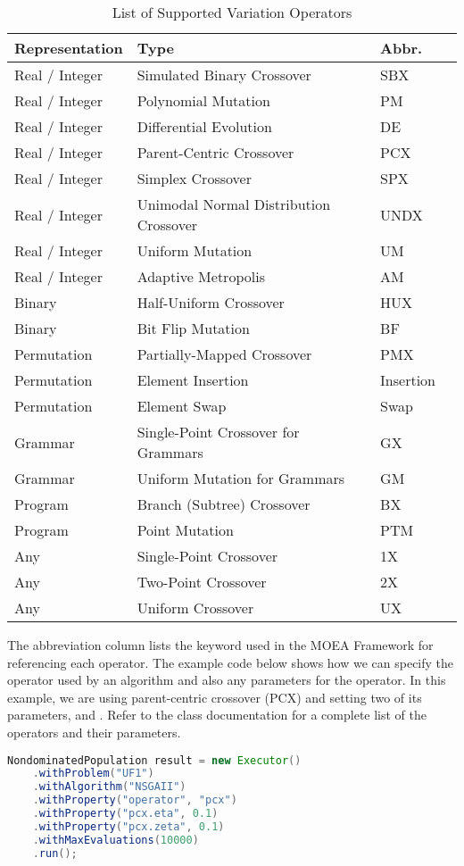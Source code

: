 \begin{table}
  \centering
  \caption{List of Supported Variation Operators}
  \label{tbl:operators}
  \begin{tabular}{llll}
    \hline
    Representation & Type & Abbr. \\
    \hline
    Real / Integer & Simulated Binary Crossover & SBX \\
    Real / Integer & Polynomial Mutation & PM \\
    Real / Integer & Differential Evolution & DE \\
    Real / Integer & Parent-Centric Crossover & PCX \\
    Real / Integer & Simplex Crossover & SPX \\
    Real / Integer & Unimodal Normal Distribution Crossover & UNDX \\
    Real / Integer & Uniform Mutation & UM \\
    Real / Integer & Adaptive Metropolis & AM \\
    Binary & Half-Uniform Crossover & HUX \\
    Binary & Bit Flip Mutation & BF \\
    Permutation & Partially-Mapped Crossover & PMX \\
    Permutation & Element Insertion & Insertion \\
    Permutation & Element Swap & Swap \\
    Grammar & Single-Point Crossover for Grammars & GX \\
    Grammar & Uniform Mutation for Grammars & GM \\
    Program & Branch (Subtree) Crossover & BX \\
    Program & Point Mutation & PTM \\
    Any & Single-Point Crossover & 1X \\
    Any & Two-Point Crossover & 2X \\
    Any & Uniform Crossover & UX \\
    \hline
  \end{tabular}
\end{table}

The abbreviation column lists the keyword used in the MOEA Framework for referencing each operator.  The example code below shows how we can specify the operator used by an algorithm and also any parameters for the operator.  In this example, we are using parent-centric crossover (PCX) and setting two of its parameters,  and .  Refer to the  class documentation for a complete list of the operators and their parameters.
\begin{lstlisting}[language=Java]
NondominatedPopulation result = new Executor()
    .withProblem("UF1")
    .withAlgorithm("NSGAII")
    .withProperty("operator", "pcx")
    .withProperty("pcx.eta", 0.1)
    .withProperty("pcx.zeta", 0.1)
    .withMaxEvaluations(10000)
    .run();
\end{lstlisting}

